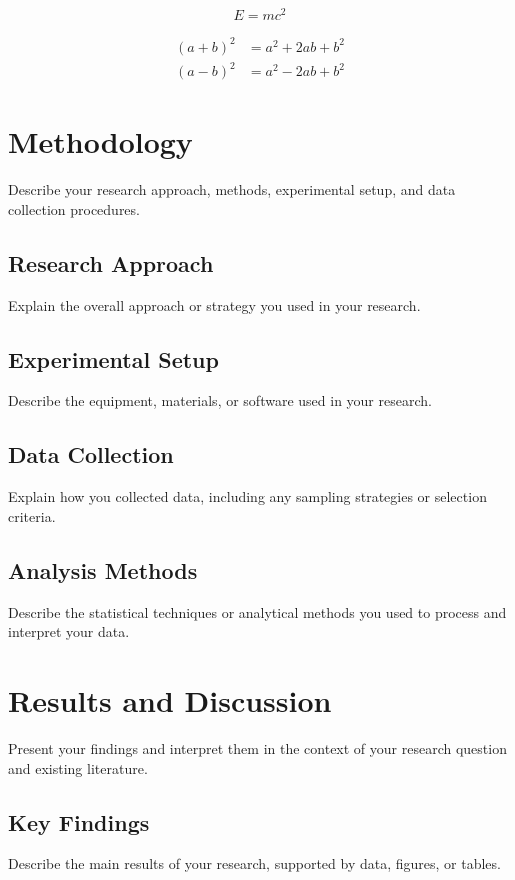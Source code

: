 \documentclass[12pt,a4paper]{report}
\begin{document}
\begin{spacing}{1.5}
    \begin{equation}
        E = mc^2
    \end{equation}

    \begin{align}
        (a+b)^2 & = a^2 + 2ab + b^2 \\
        (a-b)^2 & = a^2 - 2ab + b^2
    \end{align}

    \chapter{Methodology}
    Describe your research approach, methods, experimental setup, and data collection procedures.

    \section{Research Approach}
    Explain the overall approach or strategy you used in your research.

    \section{Experimental Setup}
    Describe the equipment, materials, or software used in your research.

    \section{Data Collection}
    Explain how you collected data, including any sampling strategies or selection criteria.

    \section{Analysis Methods}
    Describe the statistical techniques or analytical methods you used to process and interpret your data.

    \chapter{Results and Discussion}
    Present your findings and interpret them in the context of your research question and existing literature.

    \section{Key Findings}
    Describe the main results of your research, supported by data, figures, or tables.


\end{spacing}
\end{document}
